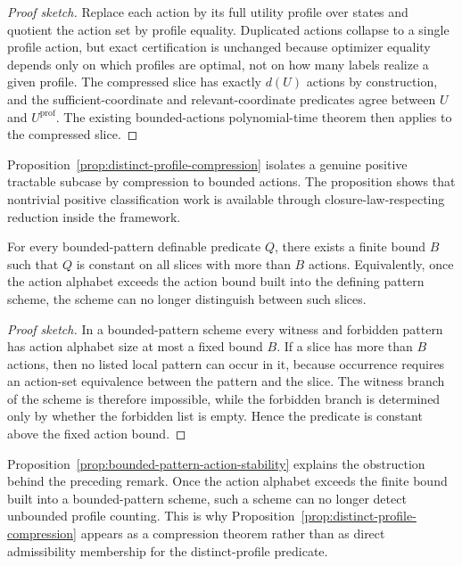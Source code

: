 \begin{proof}[Proof sketch]
Replace each action by its full utility profile over states and quotient the action set by profile equality. Duplicated actions collapse to a single profile action, but exact certification is unchanged because optimizer equality depends only on which profiles are optimal, not on how many labels realize a given profile. The compressed slice has exactly $d(U)$ actions by construction, and the sufficient-coordinate and relevant-coordinate predicates agree between $U$ and $U^{\mathrm{prof}}$. The existing bounded-actions polynomial-time theorem then applies to the compressed slice.
\end{proof}

Proposition~\ref{prop:distinct-profile-compression} isolates a genuine positive tractable subcase by compression to bounded actions. The proposition shows that nontrivial positive classification work is available through closure-law-respecting reduction inside the framework.

\begin{proposition}\label{prop:bounded-pattern-action-stability}
For every bounded-pattern definable predicate $Q$, there exists a finite bound $B$ such that $Q$ is constant on all slices with more than $B$ actions. Equivalently, once the action alphabet exceeds the action bound built into the defining pattern scheme, the scheme can no longer distinguish between such slices.
\end{proposition}

\begin{proof}[Proof sketch]
In a bounded-pattern scheme every witness and forbidden pattern has action alphabet size at most a fixed bound $B$. If a slice has more than $B$ actions, then no listed local pattern can occur in it, because occurrence requires an action-set equivalence between the pattern and the slice. The witness branch of the scheme is therefore impossible, while the forbidden branch is determined only by whether the forbidden list is empty. Hence the predicate is constant above the fixed action bound.
\end{proof}

Proposition~\ref{prop:bounded-pattern-action-stability} explains the obstruction behind the preceding remark. Once the action alphabet exceeds the finite bound built into a bounded-pattern scheme, such a scheme can no longer detect unbounded profile counting. This is why Proposition~\ref{prop:distinct-profile-compression} appears as a compression theorem rather than as direct admissibility membership for the distinct-profile predicate.

